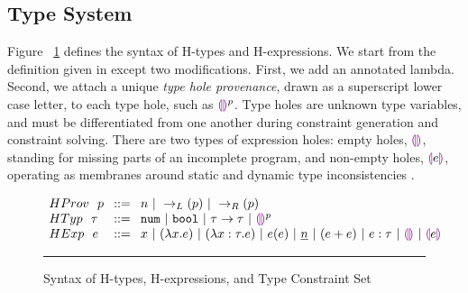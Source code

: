 \subsection{Type System}

\label{sec:typinf}
Figure ~\ref{fig:syntax_fig} defines the syntax of H-types and H-expressions. We start from the definition given in \citet{HazelnutPOPL} except two modifications. First, we add an annotated lambda. Second, we attach a unique \emph{type hole provenance}, drawn as a superscript lower case letter, to each type hole, such as $\textcolor{violet}{\llparenthesis}\textcolor{violet}{\rrparenthesis}^p$. Type holes are unknown type variables, and must be differentiated from one another during constraint generation and constraint solving. There are two types of expression holes: empty holes, $\textcolor{violet}{\llparenthesis}\textcolor{violet}{\rrparenthesis}$, standing for missing parts of an incomplete program, and non-empty holes, $\textcolor{violet}{\llparenthesis} e \textcolor{violet}{\rrparenthesis}$, operating as membranes around static and dynamic type inconsistencies \cite{HazelLive}. \par
\begin{figure}[htbp]
\vspace{-3px} 
$\arraycolsep=4pt\begin{array}{lll}
HProv~~ p & ::= & 
    n ~\vert~ 
    \rightarrow_{L}(p) ~\vert~ 
    \rightarrow_{R}(p)
    \\
HTyp~~ \tau & ::= &
  \tnum ~\vert~
  \tbool ~\vert~
  \tarr{\tau}{\tau} ~\vert~
  \ehole^p
  \\
HExp~~ e & ::= &
  x ~\vert~
  \lamfunc{x}{e} ~\vert~
  \lamfunc{x:\tau}{e} ~\vert~
  e(e) ~\vert~
  \underlinenum{n} ~\vert~
  (e+e) ~\vert~
  e: \tau ~\vert~
  \ehole  ~\vert~
  \notehole{e} 
\end{array}$
\hrule
\caption{Syntax of H-types, H-expressions, and Type Constraint Set}
\label{fig:syntax_fig}
\vspace{-5px}
\end{figure}

